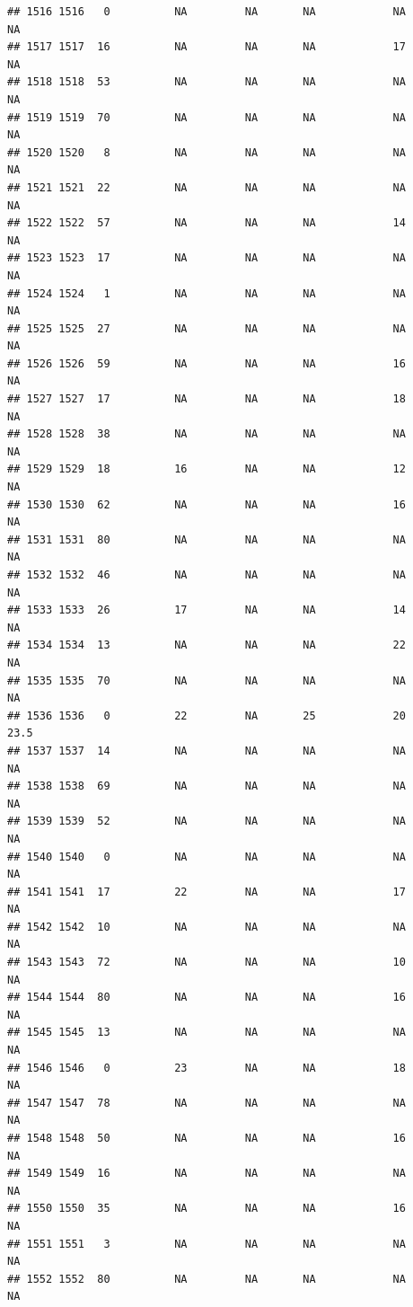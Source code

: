 \documentclass[man]{apa6}
\begin{document}
\begin{verbatim}
## 1516 1516   0          NA         NA       NA            NA       NA
## 1517 1517  16          NA         NA       NA            17       NA
## 1518 1518  53          NA         NA       NA            NA       NA
## 1519 1519  70          NA         NA       NA            NA       NA
## 1520 1520   8          NA         NA       NA            NA       NA
## 1521 1521  22          NA         NA       NA            NA       NA
## 1522 1522  57          NA         NA       NA            14       NA
## 1523 1523  17          NA         NA       NA            NA       NA
## 1524 1524   1          NA         NA       NA            NA       NA
## 1525 1525  27          NA         NA       NA            NA       NA
## 1526 1526  59          NA         NA       NA            16       NA
## 1527 1527  17          NA         NA       NA            18       NA
## 1528 1528  38          NA         NA       NA            NA       NA
## 1529 1529  18          16         NA       NA            12       NA
## 1530 1530  62          NA         NA       NA            16       NA
## 1531 1531  80          NA         NA       NA            NA       NA
## 1532 1532  46          NA         NA       NA            NA       NA
## 1533 1533  26          17         NA       NA            14       NA
## 1534 1534  13          NA         NA       NA            22       NA
## 1535 1535  70          NA         NA       NA            NA       NA
## 1536 1536   0          22         NA       25            20     23.5
## 1537 1537  14          NA         NA       NA            NA       NA
## 1538 1538  69          NA         NA       NA            NA       NA
## 1539 1539  52          NA         NA       NA            NA       NA
## 1540 1540   0          NA         NA       NA            NA       NA
## 1541 1541  17          22         NA       NA            17       NA
## 1542 1542  10          NA         NA       NA            NA       NA
## 1543 1543  72          NA         NA       NA            10       NA
## 1544 1544  80          NA         NA       NA            16       NA
## 1545 1545  13          NA         NA       NA            NA       NA
## 1546 1546   0          23         NA       NA            18       NA
## 1547 1547  78          NA         NA       NA            NA       NA
## 1548 1548  50          NA         NA       NA            16       NA
## 1549 1549  16          NA         NA       NA            NA       NA
## 1550 1550  35          NA         NA       NA            16       NA
## 1551 1551   3          NA         NA       NA            NA       NA
## 1552 1552  80          NA         NA       NA            NA       NA

\end{verbatim}
\end{document}
